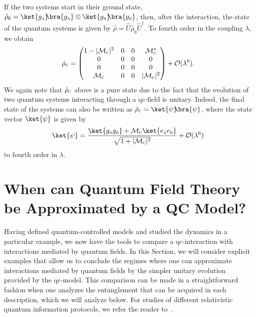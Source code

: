 \documentclass[letterpaper,12pt,titlepage,oneside,final]{book}
\newcommand{\tc}[1]{\textsc{#1}}
\begin{document}
If the two systems start in their ground state, \mbox{$\hat{\rho}_0 = \ket{g_\textsc{a}}\!\!\bra{g_\textsc{a}}\otimes\ket{g_\textsc{b}}\!\!\bra{g_\textsc{b}}$}, then, after the interaction, the state of the quantum systems is given by $\hat{\rho} = \hat{U}\hat{\rho}_0 \hat{U}^\dagger$. To fourth order in the coupling $\lambda$, we obtain
\begin{equation}\label{eq:rhoClass}
    \hat{\rho}_{\textsc{c}} = \begin{pmatrix}
        1 - |\mathcal{M}_{\textsc{c}}|^2 & 0 & 0 & \mathcal{M}_{\textsc{c}}^*\\
        0 & 0 & 0 & 0 \\
        0 & 0 & 0 & 0\\
        \mathcal{M}_{\textsc{c}} & 0 & 0 & |\mathcal{M}_{\textsc{c}}|^2
    \end{pmatrix} + \mathcal{O}(\lambda^6).
\end{equation}
We again note that $\hat{\rho}_{\textsc{c}}$ above is a pure state due to the fact that the evolution of two quantum systems interacting through a {qc-field} is unitary. Indeed, the final state of the systems can also be written as $\hat{\rho}_{\textsc{c}} = \ket{\psi}\!\!\bra{\psi}$, where the state vector $\ket{\psi}$ is given by
\begin{equation}
    \ket{\psi} = \frac{\ket{g_\tc{a}g_{\tc{b}}} + \mathcal{M}_{\textsc{c}}\ket{e_\tc{a}e_{\tc{b}}}}{\sqrt{1 + |\mathcal{M}_{\textsc{c}}|^2}} + \mathcal{O}(\lambda^6)
\end{equation}
to fourth order in $\lambda$.


\section{When can Quantum Field Theory be Approximated by a QC Model?}\label{sec:QFTapproxQC}

Having defined quantum-controlled models and studied the dynamics in a particular example, we now have the tools to compare a qc-interaction with interactions mediated by quantum fields. In this Section, we will consider explicit examples that allow us to conclude the regimes where one can approximate interactions mediated by quantum fields by the simpler unitary evolution provided by the qc-model. This comparison can be made in a straightforward fashion when one analyzes the entanglement that can be acquired in each description, which we will analyze below. For studies of different relativistic quantum information protocols, we refer the reader to~\cite{quantClass}.
\end{document}
